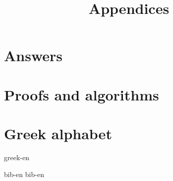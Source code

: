 \documentclass[b5paper]{article}
\begin{document}
\title{Appendices}

\maketitle
\fi


\chapter{Answers}
\label{ch:answers}
\shipoutAnswer

\chapter{Proofs and algorithms}


\chapter{Greek alphabet} \label{ch:greek-letters}
{greek-en}

\markboth{\bibname}{}

\begin{thebibliography}{99}
  {bib-en}
  {bib-en}
\end{thebibliography}

\ifx\wholebook\relax \else
\expandafter\enddocument
\fi
\end{document}
